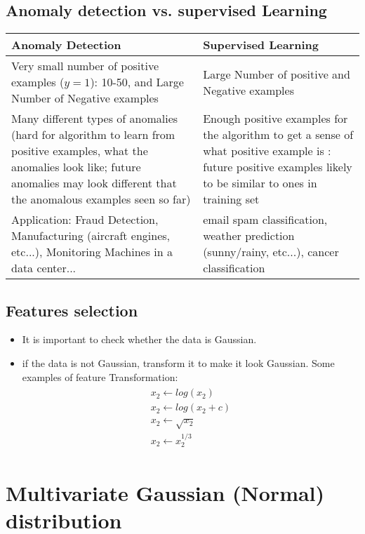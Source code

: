 \documentclass[a4paper,12pt]{report}
\begin{document}
\subsection{Anomaly detection vs. supervised Learning}
\begin{table}[H]
\begin{tabular}{|  >{\centering\arraybackslash} m{8cm} | >{\centering\arraybackslash} m{8cm}  |}
\hline
\textbf{Anomaly Detection} & \textbf{Supervised Learning} \\[2ex]
\hline
Very small number of positive examples ($y=1$): 10-50, and Large Number of Negative examples & Large Number of positive and Negative examples \\
\hline
Many different types of anomalies (hard for algorithm to learn from positive examples, what the anomalies look like; future anomalies may look different that the anomalous examples seen so far) & Enough positive examples for the algorithm to get a sense of what positive example is : future positive examples likely to be similar to ones in training set \\
\hline
Application: Fraud Detection, Manufacturing (aircraft engines, etc...), Monitoring Machines in a data center... & email spam classification, weather prediction (sunny/rainy, etc...), cancer classification \\
\hline
\end{tabular}
\end{table}
\subsection{Features selection}
\begin{itemize}
\item It is important to check whether the data is Gaussian.
\item if the data is not Gaussian, transform it to make it look Gaussian. Some examples of feature Transformation:
\begin{align}
\begin{split}
x_2 \leftarrow log(x_2) \\
x_2 \leftarrow log(x_2 + c) \\
x_2 \leftarrow \sqrt{x_2} \\
x_2 \leftarrow x_2 ^{1/3}
\end{split}
\end{align}
\end{itemize}
\section{Multivariate Gaussian (Normal) distribution}
\end{document}
